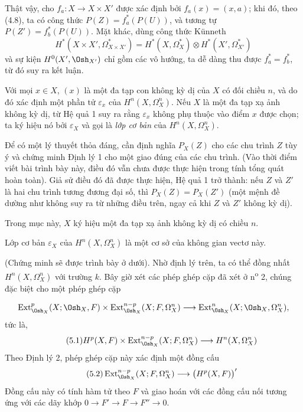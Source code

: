 Thật vậy, cho $f_a:X\longrightarrow X\times X'$ được xác định bởi
$f_a(x)=(x,a)$; khi đó, theo (4.8), ta có công thức
$P(Z)=f_a^{*}(P(U))$, và tương tự $P(Z')=f_b^{*}(P(U))$. Mặt khác, dùng công thức
Künneth
\[
  H^{*}(X\times X',\Omega_{X\times X'}^{*})
  =H^{*}(X,\Omega_X^{*})\otimes H^{*}(X',\Omega_{X'}^{*})
\]
và sự kiện $H^{0}(X',\Osh_{X'})$ chỉ gồm các vô hướng, ta dễ dàng thu được
$f_a^{*}=f_b^{*}$, từ đó suy ra kết luận.

Với mọi $x\in X$, $(x)$ là một đa tạp con không kỳ dị của $X$ có
đối chiều $n$, và do đó xác định một phần tử $\varepsilon_x$ của
$H^{n}(X,\Omega_X^{n})$. Nếu $X$ là một đa tạp xạ ảnh không kỳ dị, từ
Hệ quả 1 suy ra rằng $\varepsilon_x$ không phụ thuộc vào điểm $x$ được chọn; ta ký hiệu nó
bởi $\varepsilon_X$ và gọi là \emph{lớp cơ bản} của
$H^{n}(X,\Omega_X^{n})$.

 Để có một lý thuyết thỏa đáng, cần định nghĩa
$P_X(Z)$ cho các chu trình $Z$ tùy ý và chứng minh Định lý 1 cho một
giao đúng của các chu trình. (Vào thời điểm viết bài trình bày này, điều đó vẫn chưa được
thực hiện trong tính tổng quát hoàn toàn). Giả sử điều đó đã được thực hiện, Hệ quả 1
trở thành: nếu $Z$ và $Z'$ là hai chu trình tương đương đại số, thì
$P_X(Z)=P_X(Z')$ (một mệnh đề dường như không suy ra từ những điều trên, ngay cả khi
$Z$ và $Z'$ không kỳ dị).


Trong mục này, $X$ ký hiệu một đa tạp xạ ảnh không kỳ dị có chiều
$n$.

 Lớp cơ bản $\varepsilon_X$ của
$H^{n}(X,\Omega_X^{n})$ là một cơ sở của không gian vectơ này.

(Chứng minh sẽ được trình bày ở dưới). Nhờ định lý trên, ta có thể
đồng nhất $H^{n}(X,\Omega_X^{n})$ với trường $k$. Bây giờ xét các
phép ghép cặp đã xét ở n\textsuperscript{o} 2, chúng đặc biệt cho một
phép ghép cặp


\[
\operatorname{Ext}_{\Osh_X}^{p}(X;\Osh_X,F)
\times\operatorname{Ext}_{\Osh_X}^{n-p}(X;F,\Omega_X^{n})
\longrightarrow
\operatorname{Ext}_{\Osh_X}^{n}(X;\Osh_X,\Omega_X^{n}),
\]
tức là,
\begin{equation}\tag{5.1}
  H^{p}(X,F)
  \times\operatorname{Ext}_{\Osh_X}^{n-p}(X;F,\Omega_X^{n})
  \longrightarrow H^{n}(X,\Omega_X^{n})
\end{equation}
Theo Định lý 2, phép ghép cặp này xác định một đồng cấu
\begin{equation}\tag{5.2}
  \operatorname{Ext}_{\Osh_X}^{n-p}(X;F,\Omega_X^{n})
  \longrightarrow\bigl(H^{p}(X,F)\bigr)'
\end{equation}
Đồng cấu này có tính hàm tử theo $F$ và giao hoán với các đồng cấu nối
tương ứng với các dãy khớp $0\longrightarrow F'\longrightarrow F
\longrightarrow F''\longrightarrow0$.

